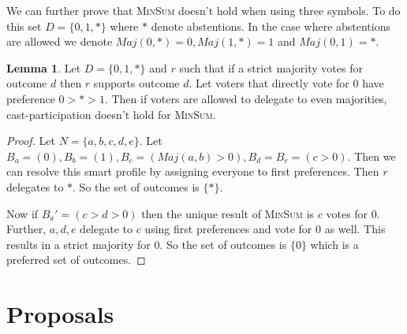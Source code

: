 \documentclass[11pt,a4paper, titlepage]{article}
\theoremstyle{definition}
\newtheorem{lemma}[theorem]{Lemma}
\begin{document}
We can further prove that \textsc{MinSum} doesn't hold when using three symbols. To do this set $D = \{0, 1, *\}$ where $*$ denote abstentions.
In the case where abstentions are allowed we denote $\mathit{Maj}(0, *) = 0, \mathit{Maj}(1, *) = 1$ and $\mathit{Maj}(0, 1) = *$.

\begin{lemma}
    Let $D = \{0, 1, *\}$ and $r$ such that if a strict majority votes for outcome $d$ then $r$ supports outcome $d$. Let voters that directly vote for $0$ have preference $0 > * > 1$. Then if voters are allowed to delegate to even majorities, cast-participation doesn't hold for \textsc{MinSum}. 
\end{lemma}

\begin{proof}
    Let $N = \{a, b, c, d, e\}$. Let $B_a = (0), B_b = (1), B_c = (\mathit{Maj}(a, b) > 0), B_d = B_e = (c > 0)$. Then we can resolve this smart profile by assigning everyone to first preferences. Then $r$ delegates to $*$. So the set of outcomes is $\{*\}$.
    
    Now if $B_a' = (c > d > 0)$ then the unique result of \textsc{MinSum} is $c$ votes for $0$. Further, $a, d, e$ delegate to $c$ using first preferences and vote for $0$ as well. This results in a strict majority for $0$. So the set of outcomes is $\{0\}$ which is a preferred set of outcomes.
\end{proof}



\iffalse
Plan for this section:
1) Cast participation is achieved only for monotone functions. So, let's focus on monotone functions
2) Prove NP-hardness for MinMax, MinSum using only binary or and binary and.
3) Prove that no constant approximator to MinMax or MinSum exists.
4) Result on whether we are able to even determine whether a vote is achievable.
5) Generalise on why the proof works for all non-delegative, fair and monotone functions. 
\fi

\newpage
\section{Proposals}
\end{document}
